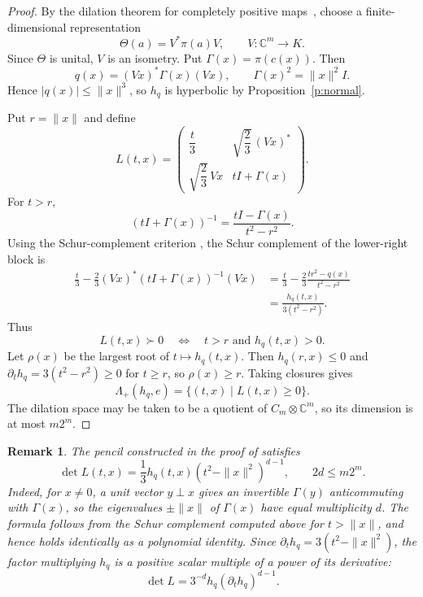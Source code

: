 \documentclass[11pt,onecolumn]{article}
\theoremstyle{blueplain}
\theoremstyle{bluedefinition}
\theoremstyle{bluedefinition}
\newtheorem{remark}[remark]{Remark}
\newcommand{\C}{\mathbb C}
\begin{document}
\begin{proof}
By the dilation theorem for completely positive maps~\cite{Stinespring}, choose a
finite-dimensional representation
\[
\Theta(a)=V^*\pi(a)V,
\qquad
V\colon\C^m\to K.
\]
Since $\Theta$ is unital, $V$ is an isometry. Put
$\Gamma(x)=\pi(c(x))$. Then
\[
q(x)=(Vx)^*\Gamma(x)(Vx),
\qquad
\Gamma(x)^2=\|x\|^2I.
\]
Hence $|q(x)|\leqslant\|x\|^3$, so $h_q$ is hyperbolic by
Proposition~\ref{p:normal}.

Put $r=\|x\|$ and define
\begin{equation*}
L(t,x)=
\begin{pmatrix}
\dfrac t3&\sqrt{\dfrac23}\,(Vx)^*\\[2mm]
\sqrt{\dfrac23}\,Vx&tI+\Gamma(x)
\end{pmatrix}.
\end{equation*}
For $t>r$,
\[
(tI+\Gamma(x))^{-1}
=\frac{tI-\Gamma(x)}{t^2-r^2}.
\]
Using the Schur-complement criterion
\cite[Appendix~A.5.5]{BoydVandenberghe}, the Schur complement of the
lower-right block is
\begin{align*}
\frac t3
-\frac23(Vx)^*(tI+\Gamma(x))^{-1}(Vx)
&=\frac t3-\frac23\frac{tr^2-q(x)}{t^2-r^2}\\
&=\frac{h_q(t,x)}{3(t^2-r^2)}.
\end{align*}
Thus
\[
L(t,x)\succ0
\quad\Longleftrightarrow\quad
t>r\text{ and }h_q(t,x)>0.
\]
Let $\rho(x)$ be the largest root of $t\mapsto h_q(t,x)$. Then
$h_q(r,x)\leqslant0$ and
$\partial_th_q=3(t^2-r^2)\geqslant0$ for $t\geqslant r$, so
$\rho(x)\geqslant r$. Taking closures gives
\[
\Lambda_+(h_q,e)=\{(t,x)\mid L(t,x)\geqslant0\}.
\]
The dilation space may be taken to be a quotient of
$C_m\otimes\C^m$, so its dimension is at most $m2^m$.
\end{proof}

\begin{remark}
The pencil constructed in the proof of  satisfies
\[
 \det L(t,x)=\frac13 h_q(t,x)
 (t^2-\|x\|^2)^{d-1},\qquad 2d\leqslant m2^m.
\]
Indeed, for $x\ne0$, a unit vector $y\perp x$ gives an invertible
$\Gamma(y)$ anticommuting with $\Gamma(x)$, so the eigenvalues
$\pm\|x\|$ of $\Gamma(x)$ have equal multiplicity $d$.
The formula follows from the Schur complement computed above for
$t>\|x\|$, and hence holds identically as a polynomial identity.
Since $\partial_t h_q=3(t^2-\|x\|^2)$, the factor multiplying $h_q$
is a positive scalar multiple of a power of its derivative:
\[
 \det L=3^{-d}h_q(\partial_t h_q)^{d-1}.
\]
\end{remark}
\end{document}
